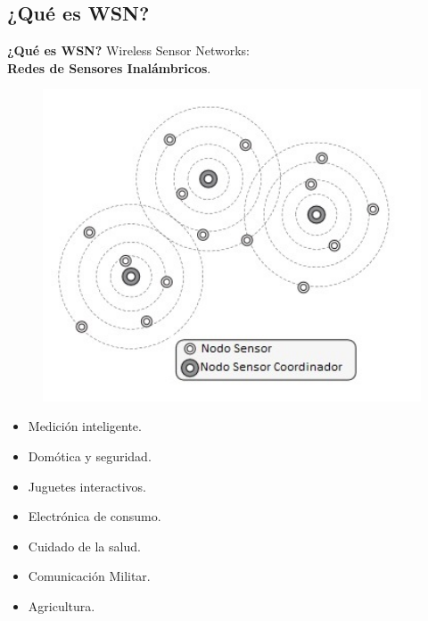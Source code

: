 \documentclass[aspectratio=43, handout]{beamer}
\begin{document}
\subsection[WSN]{¿Qué es WSN?}
\begin{frame}{\textbf{\LARGE{¿Qué es WSN?}}}
\fontsize{14pt}{14}\selectfont
\noindent Wireless Sensor Networks:\\
\textbf{Redes de Sensores Inalámbricos}.
\begin{minipage}[c]{1.0\linewidth}
	\begin{minipage}[c]{0.4\linewidth}
		\begin{figure}[H]			
		\includegraphics[width=1.2\textwidth]{./imagenes/WSN.jpg}
		\end{figure}	  	  	
	\end{minipage}
	\begin{minipage}[c]{0.58\linewidth}
			\vspace{20px}
		\begin{itemize}
			\item Medición inteligente.
			\vspace{5px}
			\item Domótica y seguridad.
			\vspace{5px}
			\item Juguetes interactivos.
			\vspace{5px}
			\item Electrónica de consumo.
			\vspace{5px}
			\item Cuidado de la salud.
			\vspace{5px}
			\item Comunicación Militar.
			\vspace{5px}
			\item Agricultura.
			\vspace{5px}
		\end{itemize}
\end{minipage}
\end{minipage}
\end{frame}
\end{document}
